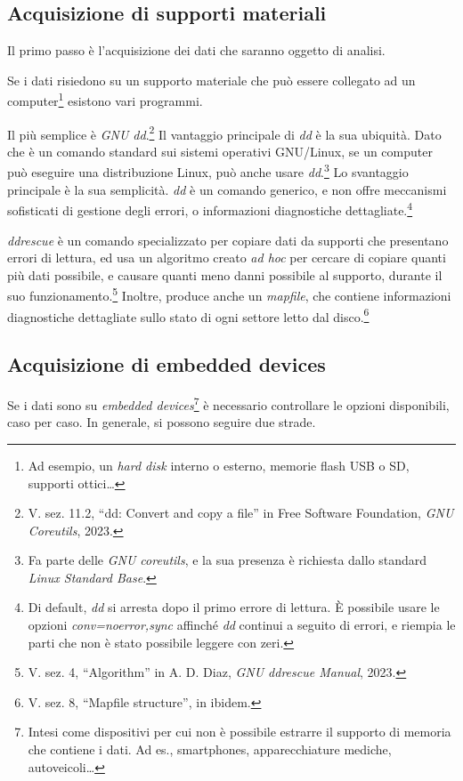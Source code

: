 \documentclass[
  12pt,
  a4paper,
]{book}
\begin{document}
\subsection{Acquisizione di supporti
materiali}\label{acquisizione-di-supporti-materiali}

Il primo passo è l'acquisizione dei dati che saranno oggetto di analisi.

Se i dati risiedono su un supporto materiale che può essere collegato ad
un computer\footnote{Ad esempio, un \emph{hard disk} interno o esterno,
  memorie flash USB o SD, supporti ottici\ldots{}} esistono vari
programmi.

Il più semplice è \emph{GNU dd}.\footnote{V. sez. 11.2, ``dd: Convert
  and copy a file'' in Free Software Foundation, \emph{GNU Coreutils},
  2023.} Il vantaggio principale di \emph{dd} è la sua ubiquità. Dato
che è un comando standard sui sistemi operativi GNU/Linux, se un
computer può eseguire una distribuzione Linux, può anche usare
\emph{dd}.\footnote{Fa parte delle \emph{GNU coreutils}, e la sua
  presenza è richiesta dallo standard \emph{Linux Standard Base}.} Lo
svantaggio principale è la sua semplicità. \emph{dd} è un comando
generico, e non offre meccanismi sofisticati di gestione degli errori, o
informazioni diagnostiche dettagliate.\footnote{Di default, \emph{dd} si
  arresta dopo il primo errore di lettura. È possibile usare le opzioni
  \emph{conv=noerror,sync} affinché \emph{dd} continui a seguito di
  errori, e riempia le parti che non è stato possibile leggere con zeri.}

\emph{ddrescue} è un comando specializzato per copiare dati da supporti
che presentano errori di lettura, ed usa un algoritmo creato \emph{ad
hoc} per cercare di copiare quanti più dati possibile, e causare quanti
meno danni possibile al supporto, durante il suo
funzionamento.\footnote{V. sez. 4, ``Algorithm'' in A. D. Diaz,
  \emph{GNU ddrescue Manual}, 2023.} Inoltre, produce anche un
\emph{mapfile}, che contiene informazioni diagnostiche dettagliate sullo
stato di ogni settore letto dal disco.\footnote{V. sez. 8, ``Mapfile
  structure'', in ibidem.}

\subsection{Acquisizione di embedded
devices}\label{acquisizione-di-embedded-devices}

Se i dati sono su \emph{embedded devices}\footnote{Intesi come
  dispositivi per cui non è possibile estrarre il supporto di memoria
  che contiene i dati. Ad es., smartphones, apparecchiature mediche,
  autoveicoli\ldots{}} è necessario controllare le opzioni disponibili,
caso per caso. In generale, si possono seguire due strade.
\end{document}
